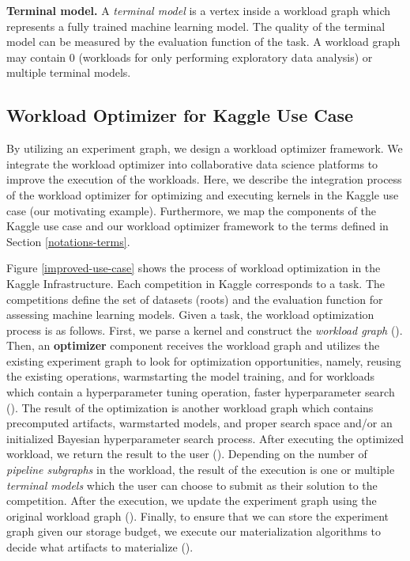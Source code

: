 \textbf{Terminal model.} A \textit{terminal model} is a vertex inside a workload graph which represents a fully trained machine learning model.
The quality of the terminal model can be measured by the evaluation function of the task.
A workload graph may contain $0$ (workloads for only performing exploratory data analysis) or multiple terminal models.


\subsection{Workload Optimizer for Kaggle Use Case}
By utilizing an experiment graph, we design a workload optimizer framework.
We integrate the workload optimizer into collaborative data science platforms to improve the execution of the workloads.
Here, we describe the integration process of the workload optimizer for optimizing and executing kernels in the Kaggle use case (our motivating example).
Furthermore, we map the components of the Kaggle use case and our workload optimizer framework to the terms defined in Section \ref{notations-terms}.

Figure \ref{improved-use-case} shows the process of workload optimization in the Kaggle Infrastructure.
Each competition in Kaggle corresponds to a task.
The competitions define the set of datasets (roots) and the evaluation function for assessing machine learning models. 
Given a task, the workload optimization process is as follows.
First, we parse a kernel and construct the \textit{workload graph} ().
Then, an \textbf{optimizer} component receives the workload graph and utilizes the existing experiment graph to look for optimization opportunities, namely, reusing the existing operations, warmstarting the model training, and for workloads which contain a hyperparameter tuning operation, faster hyperparameter search ().
The result of the optimization is another workload graph which contains precomputed artifacts, warmstarted models, and proper search space and/or an initialized Bayesian hyperparameter search process.
After executing the optimized workload, we return the result to the user ().
Depending on the number of \textit{pipeline subgraphs} in the workload, the result of the execution is one or multiple \textit{terminal models} which the user can choose to submit as their solution to the competition.
After the execution, we update the experiment graph using the original workload graph ().
Finally, to ensure that we can store the experiment graph given our storage budget, we execute our materialization algorithms to decide what artifacts to materialize ().

